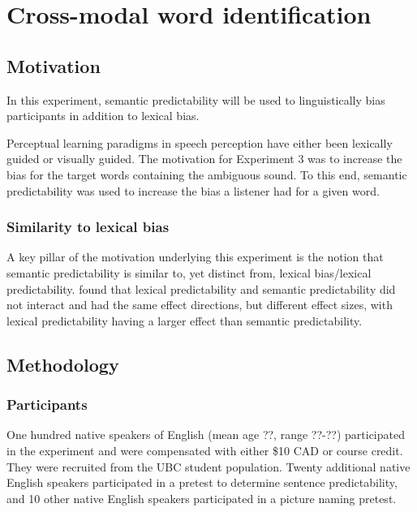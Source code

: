 
\chapter{Cross-modal word identification}


\section{Motivation}

In this experiment, semantic predictability will be used to linguistically bias participants in addition to lexical bias.  

Perceptual learning paradigms in speech perception have either been lexically guided or visually guided.
The motivation for Experiment 3 was to increase the bias for the target words containing the ambiguous sound.  
To this end, semantic predictability was used to increase the bias a listener had for a given word.  

\subsection{Similarity to lexical bias}

A key pillar of the motivation underlying this experiment is the notion that semantic predictability is similar to, yet distinct from, lexical bias/lexical predictability.  
\citet{Scarborough2010} found that lexical predictability and semantic predictability did not interact and had the same effect directions, but different effect sizes, with lexical predictability having a larger effect than semantic predictability.

\section{Methodology}

\subsection{Participants}

One hundred native speakers of English (mean age ??, range ??-??) participated in the experiment and were compensated with either \$10 CAD or course credit. 
They were recruited from the UBC student population.  
Twenty additional native English speakers participated in a pretest to determine sentence predictability, and 10 other native English speakers participated in a picture naming pretest.

